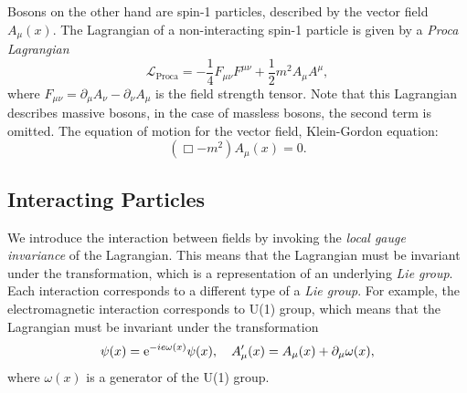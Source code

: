 Bosons on the other hand are spin-1 particles, described by the vector field $A_\mu(x)$.
The Lagrangian of a non-interacting spin-1 particle is given by a \emph{Proca Lagrangian}
\begin{equation}
    \label{eq:proca_lag}
    \mathcal{L}_{\text{Proca}} = - \frac{1}{4} F_{\mu\nu} F^{\mu\nu} + \frac{1}{2} m^2 A_\mu A^\mu,
\end{equation}
where $F_{\mu\nu} = \partial_\mu A_\nu - \partial_\nu A_\mu$ is the field strength tensor.
Note that this Lagrangian describes massive bosons, in the case of massless bosons, the second term is omitted.
The equation of motion for the vector field, Klein-Gordon equation:
\begin{equation}
    \label{eq:klein_gordon}
    \left( \Box - m^2 \right) A_\mu(x) = 0.
\end{equation}

\subsection{Interacting Particles}
\label{sec:interacting_particles}
We introduce the interaction between fields by invoking the \emph{local gauge invariance} of the Lagrangian. 
This means that the Lagrangian must be invariant under the transformation, which is a representation of an underlying \emph{Lie group}. 
Each interaction corresponds to a different type of a \emph{Lie group}.
For example, the electromagnetic interaction corresponds to U(1) group, which means that the Lagrangian must be invariant under the transformation
\begin{equation}
    \label{eq:gauge_inv_QED}
    \psi(x) = \mathrm{e}^{-i e \omega(x)}\psi(x), \quad A_\mu'(x) = A_\mu(x) + \partial_\mu \omega(x),
\end{equation}
where $\omega(x)$ is a generator of the U(1) group.

